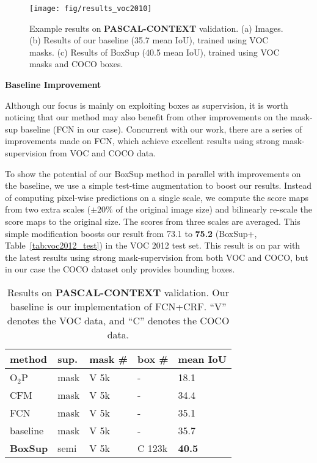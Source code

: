 \documentclass[10pt,twocolumn,letterpaper]{article}
\newcommand{\tn}[1]{\footnotesize{#1}}
\begin{document}
\begin{figure*}[t]
	\centering
	\texttt{[image: fig/results\_voc2010]}
	\caption{Example results on \textbf{PASCAL-CONTEXT} validation. (a) Images. (b) Results of our baseline (35.7 mean IoU), trained using VOC masks. (c) Results of BoxSup (40.5 mean IoU), trained using VOC masks and COCO boxes.}
	\label{fig:results_voc2010}
\end{figure*}

\vspace{8pt}
\noindent\textbf{Baseline Improvement}

Although our focus is mainly on exploiting boxes as supervision, it is worth noticing that our method may also benefit from other improvements on the mask-sup baseline (FCN in our case). Concurrent with our work, there are a series of improvements \cite{zheng2015conditional,Chen2015} made on FCN, which achieve excellent results using strong mask-supervision from VOC and COCO data.

To show the potential of our BoxSup method in parallel with improvements on the baseline, we use a simple test-time augmentation to boost our results. Instead of computing pixel-wise predictions on a single scale, we compute the score maps from two extra scales ($\pm20\%$ of the original image size) and bilinearly re-scale the score maps to the original size. The scores from three scales are averaged. This simple modification boosts our result from 73.1 to \textbf{75.2} (BoxSup+, Table~\ref{tab:voc2012_test}) in the VOC 2012 test set. This result is on par with the latest results using strong mask-supervision from both VOC and COCO, but in our case the  COCO dataset only provides bounding boxes.

\setlength{\tabcolsep}{6pt}
\renewcommand{\arraystretch}{1.1}
\begin{table}[t]
	\begin{center}
		\begin{tabular}{x|x|x|x|x}
			\hline
			method & sup. & mask \# & box \# & \tn{mean IoU}\\
			\hline
			\hline
			O$_2$P \cite{carreira2012semantic} & mask & V 5k & - & 18.1\\
			CFM \cite{Dai2015} & mask & V 5k & - & 34.4\\
			FCN \cite{Long2015} & mask & V 5k & - & 35.1\\
			\hline
			baseline & mask & V 5k & - & 35.7\\
			\textbf{BoxSup} & semi & V 5k & C 123k & \textbf{40.5}\\
			\hline
		\end{tabular}
	\end{center}
	\caption{Results on \textbf{PASCAL-CONTEXT} \cite{mottaghi2014role} validation. Our baseline is our implementation of FCN+CRF. ``V'' denotes the VOC data, and ``C'' denotes the COCO data.}
	\label{tab:voc2010_val}
\end{table}
\end{document}
